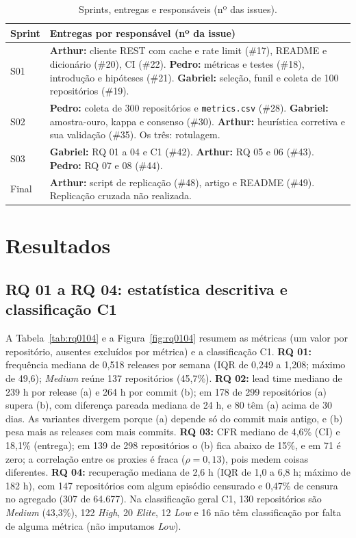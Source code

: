 \documentclass[12pt]{article}
\begin{document}
\begin{table}[!t]
\centering
\footnotesize
\setlength{\tabcolsep}{3pt}
\caption{Sprints, entregas e responsáveis (nº das issues).}
\label{tab:etapas}
\begin{tabular}{>{\raggedright\arraybackslash}p{1.2cm}>{\raggedright\arraybackslash}p{14.4cm}}
\toprule
Sprint & Entregas por responsável (nº da issue) \\
\midrule
S01 & \textbf{Arthur:} cliente REST com cache e rate limit (\#17), README e dicionário (\#20), CI (\#22). \textbf{Pedro:} métricas e testes (\#18), introdução e hipóteses (\#21). \textbf{Gabriel:} seleção, funil e coleta de 100 repositórios (\#19). \\
S02 & \textbf{Pedro:} coleta de 300 repositórios e \texttt{metrics.csv} (\#28). \textbf{Gabriel:} amostra-ouro, kappa e consenso (\#30). \textbf{Arthur:} heurística corretiva e sua validação (\#35). Os três: rotulagem. \\
S03 & \textbf{Gabriel:} RQ 01 a 04 e C1 (\#42). \textbf{Arthur:} RQ 05 e 06 (\#43). \textbf{Pedro:} RQ 07 e 08 (\#44). \\
Final & \textbf{Arthur:} script de replicação (\#48), artigo e README (\#49). Replicação cruzada não realizada. \\
\bottomrule
\end{tabular}
\end{table}

\section{Resultados}
\label{sec:resultados}

\subsection{RQ 01 a RQ 04: estatística descritiva e classificação C1}
\label{sec:rq0104}

A Tabela~\ref{tab:rq0104} e a Figura~\ref{fig:rq0104} resumem as métricas (um valor por repositório, ausentes excluídos por métrica) e a classificação C1. \textbf{RQ 01:} frequência mediana de 0,518 releases por semana (IQR de 0,249 a 1,208; máximo de 49,6); \emph{Medium} reúne 137 repositórios (45,7\%). \textbf{RQ 02:} lead time mediano de 239 h por release (a) e 264 h por commit (b); em 178 de 299 repositórios (a) supera (b), com diferença pareada mediana de 24 h, e 80 têm (a) acima de 30 dias. As variantes divergem porque (a) depende só do commit mais antigo, e (b) pesa mais as releases com mais commits. \textbf{RQ 03:} CFR mediano de 4,6\% (CI) e 18,1\% (entrega); em 139 de 298 repositórios o (b) fica abaixo de 15\%, e em 71 é zero; a correlação entre os proxies é fraca ($\rho=0{,}13$), pois medem coisas diferentes. \textbf{RQ 04:} recuperação mediana de 2,6 h (IQR de 1,0 a 6,8 h; máximo de 182 h), com 147 repositórios com algum episódio censurado e 0,47\% de censura no agregado (307 de 64.677). Na classificação geral C1, 130 repositórios são \emph{Medium} (43,3\%), 122 \emph{High}, 20 \emph{Elite}, 12 \emph{Low} e 16 não têm classificação por falta de alguma métrica (não imputamos \emph{Low}).
\end{document}
